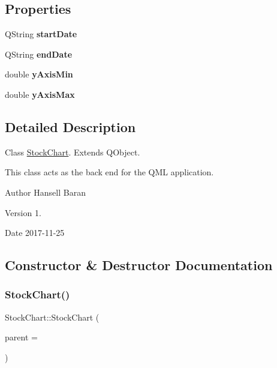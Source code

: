 \subsection*{Properties}
\begin{DoxyCompactItemize}
\item 
\mbox{\label{class_stock_chart_add7099e870c86ce5a1c9ba88bced379c}} 
Q\+String {\bfseries start\+Date}
\item 
\mbox{\label{class_stock_chart_aab43c54ca8f5aafcb68170b7684775f4}} 
Q\+String {\bfseries end\+Date}
\item 
\mbox{\label{class_stock_chart_ae2c25f0548c61c72c2467b4bbf519a09}} 
double {\bfseries y\+Axis\+Min}
\item 
\mbox{\label{class_stock_chart_a77e182d1098f84f08bbd23bd0e2dbf9a}} 
double {\bfseries y\+Axis\+Max}
\end{DoxyCompactItemize}


\subsection{Detailed Description}
Class \hyperlink{class_stock_chart}{Stock\+Chart}. Extends Q\+Object. 

This class acts as the back end for the Q\+ML application. \begin{DoxyAuthor}{Author}
Hansell Baran 
\end{DoxyAuthor}
\begin{DoxyVersion}{Version}
1. 
\end{DoxyVersion}
\begin{DoxyDate}{Date}
2017-\/11-\/25 
\end{DoxyDate}


\subsection{Constructor \& Destructor Documentation}
\mbox{\label{class_stock_chart_a93b8197ae88bda092ea1fd3a123ed7ea}} 
\subsubsection{\texorpdfstring{Stock\+Chart()}{StockChart()}}
{\footnotesize\ttfamily Stock\+Chart\+::\+Stock\+Chart (\begin{DoxyParamCaption}\item[{Q\+Object $\ast$}]{parent = {} }\end{DoxyParamCaption})\hspace{0.3cm}{\ttfamily [explicit]}}



